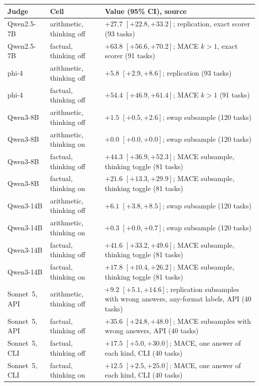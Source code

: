 \begin{tabular}{llL{6.2cm}}
\toprule
Judge & Cell & Value (95\% CI), source \\
\midrule
Qwen2.5-7B & arithmetic, thinking off & $+27.7$ {\scriptsize$[+22.8,+33.2]$}; replication, exact scorer (93 tasks) \\
Qwen2.5-7B & factual, thinking off & $+63.8$ {\scriptsize$[+56.6,+70.2]$}; \textsc{MACE} $k{>}1$, exact scorer (91 tasks) \\
phi-4 & arithmetic, thinking off & $+5.8$ {\scriptsize$[+2.9,+8.6]$}; replication (93 tasks) \\
phi-4 & factual, thinking off & $+54.4$ {\scriptsize$[+46.9,+61.4]$}; \textsc{MACE} $k{>}1$ (91 tasks) \\
Qwen3-8B & arithmetic, thinking off & $+1.5$ {\scriptsize$[+0.5,+2.6]$}; swap subsample (120 tasks) \\
Qwen3-8B & arithmetic, thinking on & $+0.0$ {\scriptsize$[+0.0,+0.0]$}; swap subsample (120 tasks) \\
Qwen3-8B & factual, thinking off & $+44.3$ {\scriptsize$[+36.9,+52.3]$}; MACE subsample, thinking toggle (81 tasks) \\
Qwen3-8B & factual, thinking on & $+21.6$ {\scriptsize$[+13.3,+29.9]$}; MACE subsample, thinking toggle (81 tasks) \\
Qwen3-14B & arithmetic, thinking off & $+6.1$ {\scriptsize$[+3.8,+8.5]$}; swap subsample (120 tasks) \\
Qwen3-14B & arithmetic, thinking on & $+0.3$ {\scriptsize$[+0.0,+0.7]$}; swap subsample (120 tasks) \\
Qwen3-14B & factual, thinking off & $+41.6$ {\scriptsize$[+33.2,+49.6]$}; MACE subsample, thinking toggle (81 tasks) \\
Qwen3-14B & factual, thinking on & $+17.8$ {\scriptsize$[+10.4,+26.2]$}; MACE subsample, thinking toggle (81 tasks) \\
Sonnet~5, API & arithmetic, thinking off & $+9.2$ {\scriptsize$[+5.1,+14.6]$}; replication subsamples with wrong answers, any-format labels, API (40 tasks) \\
Sonnet~5, API & factual, thinking off & $+35.6$ {\scriptsize$[+24.8,+48.0]$}; MACE subsamples with wrong answers, API (40 tasks) \\
Sonnet~5, CLI & factual, thinking off & $+17.5$ {\scriptsize$[+5.0,+30.0]$}; MACE, one answer of each kind, CLI (40 tasks) \\
Sonnet~5, CLI & factual, thinking on & $+12.5$ {\scriptsize$[+2.5,+25.0]$}; MACE, one answer of each kind, CLI (40 tasks) \\
\bottomrule
\end{tabular}
